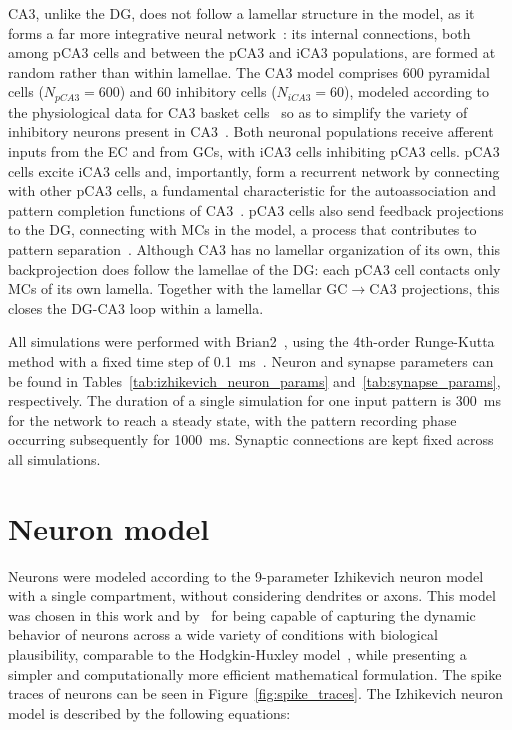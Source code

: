 CA3, unlike the DG, does not follow a lamellar structure in the model, as it forms a far more integrative neural
network~\parencite{pakHippocampal2022, watsonHuman2025}: its internal connections, both among pCA3 cells and between the pCA3 and
iCA3 populations, are formed at random rather than within lamellae. The CA3 model comprises 600 pyramidal cells ($N_{pCA3} = 600$) and 60
inhibitory cells ($N_{iCA3} = 60$), modeled according to the physiological data for CA3 basket cells~\parencite{wheelerHippocampomeorg2023}
so as to simplify the variety of inhibitory neurons present in CA3~\parencite{kopsickFormation2024}. Both neuronal populations
receive afferent inputs from the EC and from GCs, with iCA3 cells inhibiting pCA3 cells\@. pCA3 cells excite iCA3 cells and,
importantly, form a recurrent network by connecting with other pCA3 cells, a fundamental characteristic for the autoassociation
and pattern completion functions of CA3~\parencite{kopsickFormation2024, rollsMechanisms2013}\@. pCA3 cells also send feedback
projections to the DG, connecting with MCs in the model, a process that contributes to pattern
separation~\parencite{myersPattern2011}. Although CA3 has no lamellar organization of its own, this backprojection does follow the
lamellae of the DG\@: each pCA3 cell contacts only MCs of its own lamella. Together with the lamellar GC$\to$CA3 projections, this
closes the DG-CA3 loop within a lamella.

All simulations were performed with Brian2~\parencite{stimbergBrian2019a}, using the 4th-order Runge-Kutta method with a fixed time
step of \SI{0.1}{\milli\second}~\parencite{butcherHistory1996}. Neuron and synapse parameters can be found in
Tables~\ref{tab:izhikevich_neuron_params} and~\ref{tab:synapse_params}, respectively. The duration of a single simulation for
one input pattern is \SI{300}{\milli\second} for the network to reach a steady state, with the pattern recording phase
occurring subsequently for \SI{1000}{\milli\second}. Synaptic connections are kept fixed across all simulations.



\section{Neuron model}

Neurons were modeled according to the 9-parameter Izhikevich neuron model~\parencite[chapter~8]{izhikevichDynamical2006} with a single
compartment, without considering dendrites or axons. This model was chosen in this work and by~\textcite{wheelerHippocampomeorg2023}
for being capable of capturing the dynamic behavior of neurons across a wide variety of conditions with biological plausibility,
comparable to the Hodgkin-Huxley model~\parencite{hodgkinQuantitative1952b}, while presenting a simpler and computationally more
efficient mathematical formulation. The spike traces of neurons can be seen in Figure~\ref{fig:spike_traces}. The Izhikevich
neuron model is described by the following equations:


